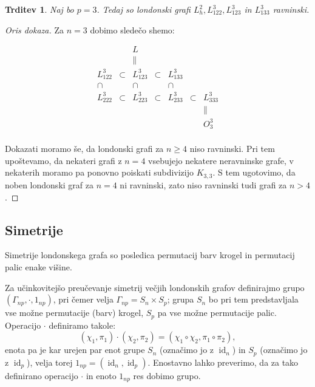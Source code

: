 \documentclass[11pt,a4paper]{article}
\theoremstyle{definition} %
\theoremstyle{plain} %
\newtheorem{trditev}[definicija]{Trditev}
\DeclareMathOperator {\id} {id}
\begin{document}
\begin{trditev}
    Naj bo $p=3$. Tedaj so londonski grafi $L_h^2, L_{122}^3,L_{123}^3$ in $ L_{133}^3$ ravninski.
\end{trditev}
\begin{proof}[Oris dokaza]
    Za $n=3$ dobimo sledečo shemo:
    
    \[
    \begin{matrix}
    & & L & & & & \\
    & & \parallel & & & & \\
    L_{122}^3 & \subset & L_{123}^3 & \subset & L_{133}^3 & & \\
    \cap & & \cap & & \cap & & \\
    L_{222}^3 & \subset & L_{223}^3 & \subset & L_{233}^3 & \subset & L_{333}^3 \\
    & & & & & & \parallel \\
    & & & & & & O^3_3 \\
    \end{matrix}
    \]
    
    Dokazati moramo še, da londonski grafi za $n \geq 4$ niso ravninski. Pri tem upoštevamo, da nekateri grafi z $n = 4$ vsebujejo nekatere neravninske grafe, v nekaterih moramo pa ponovno poiskati subdivizijo $K_{3,3}$. S tem ugotovimo, da noben londonski graf za $n=4$ ni ravninski, zato niso ravninski tudi grafi za $n>4$.
\end{proof}

\subsection{Simetrije}

Simetrije londonskega grafa so posledica permutacij barv krogel in permutacij palic enake višine.

Za učinkovitejšo preučevanje simetrij večjih londonskih grafov definirajmo grupo $(\Gamma_{np}, \cdot, 1_{np})$, pri čemer velja $\Gamma_{np} = S_n \times S_p$; grupa $S_n$ bo pri tem predstavljala vse možne permutacije (barv) krogel, $S_p$ pa vse možne permutacije palic. Operacijo $\cdot$ definiramo takole:
\[ (\chi_1,\pi_1) \cdot (\chi_2,\pi_2) = (\chi_1 \circ \chi_2,\pi_1 \circ \pi_2), \]
enota pa je kar urejen par enot grupe $S_n$ (označimo jo z $\id_n$) in $S_p$ (označimo jo z $\id_p$), velja torej $1_{np} = (\id_n, \id_p) $. Enostavno lahko preverimo, da za tako definirano operacijo $\cdot$ in enoto $1_{np}$ res dobimo grupo. 
\end{document}
